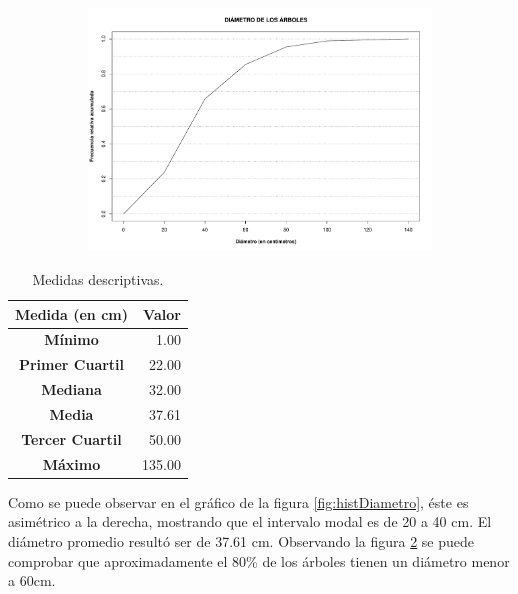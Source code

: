 \documentclass[11pt]{article}
\begin{document}
\begin{figure}[h!]
  \ContinuedFloat
  \begin{center}
    \begin{subfigure}[b]{0.9\linewidth}
      \includegraphics[width=\linewidth]{acumDiametro.pdf}
      \caption{}
      \label{fig:acumDiametro}
    \end{subfigure}
    \caption{}
  \end{center}
\end{figure}

\newpage

\begin{table}[h!]
  \begin{center}
    \begin{tabular}{| c | r |}
      \hline
      \textbf{Medida (en cm)} & \textbf{Valor} \\ \hline
      \textbf{Mínimo} & 1.00 \\ \hline
      \textbf{Primer Cuartil} & 22.00 \\ \hline
      \textbf{Mediana} & 32.00 \\ \hline
      \textbf{Media} & 37.61 \\ \hline
      \textbf{Tercer Cuartil} & 50.00 \\ \hline
      \textbf{Máximo} & 135.00 \\ \hline
    \end{tabular}
    \caption{Medidas descriptivas.}
    \label{tab:descripDiametro}
  \end{center}
\end{table}

\begin{justify}
  Como se puede observar en el gráfico de la figura \ref{fig:histDiametro},
  éste es asimétrico a la derecha, mostrando que el intervalo modal
  es de 20 a 40 cm. El diámetro promedio resultó ser
  de 37.61 cm. Observando la figura
  \ref{fig:acumDiametro} se puede comprobar que aproximadamente el 80\%
  de los árboles tienen un diámetro menor a 60cm.
\end{justify}
\end{document}
